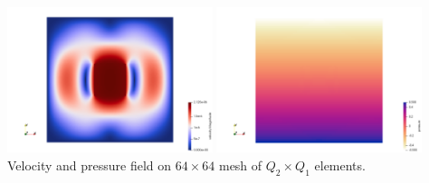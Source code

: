 \begin{center}
\includegraphics[width=6cm]{python_codes/fieldstone_120/results_sinker/velocity}
\includegraphics[width=6cm]{python_codes/fieldstone_120/results_sinker/pressure}\\
{\captionfont Velocity and pressure field on $64\times 64$ mesh of $Q_2\times Q_1$ elements.}
\end{center}


